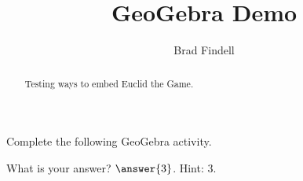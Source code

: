\documentclass[nooutcomes]{ximera}
\title{GeoGebra Demo}
\author{Brad Findell}
\begin{document}
\begin{abstract}
Testing ways to embed Euclid the Game. 
\end{abstract}
\maketitle


\begin{problem}
Complete the following GeoGebra activity.  

\ifxake
{}
\fi
What is your answer? $\answer{3}$.  Hint: 3. 

%




\end{problem}

%
%
%
%
\end{document}
